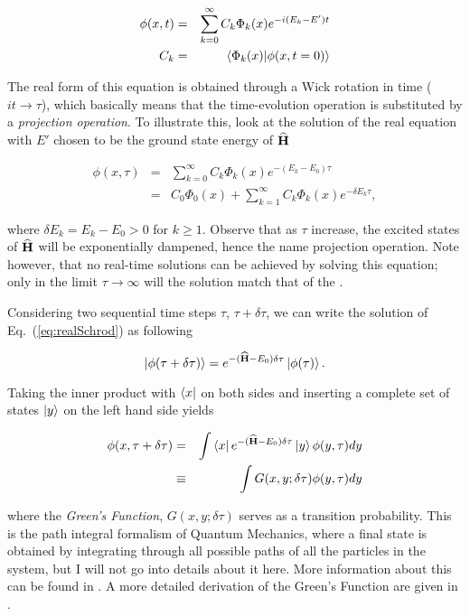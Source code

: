 \begin{eqnarray}
 \phi(x, t) &=& \sum_{k=0}^{\infty} C_k\Phi_k(x)e^{-i(E_k - E')t} \\
 C_k &=& \left\langle \Phi_k(x) | \phi(x, t=0)\right\rangle
\label{eq:realSchrod}
 \end{eqnarray}


The real form of this equation is obtained through a Wick rotation in time ($it \rightarrow \tau$), which basically means that the time-evolution operation is substituted by a \textit{projection operation}. To illustrate this, look at the solution of the real equation with $E'$ chosen to be the ground state energy of ${\bf\widehat{H}}$

\begin{eqnarray}
 \phi(x, \tau) &=& \sum_{k=0}^{\infty} C_k\Phi_k(x)e^{-(E_k - E_0)\tau} \\
                    &=& C_0\Phi_0(x) + \sum_{k=1}^{\infty} C_k\Phi_k(x)e^{-\delta E_k\tau},
\end{eqnarray}

where $\delta E_k = E_k - E_0 > 0$ for $k \ge 1$. Observe that as $\tau$ increase, the excited states of ${\bf\widehat{H}}$ will be exponentially dampened, hence the name projection operation. Note however, that no real-time solutions can be achieved by solving this equation; only in the limit $\tau\rightarrow\infty$ will the solution match that of the \schrodinger.


Considering two sequential time steps $\tau$, $\tau + \delta\tau$, we can write the solution of Eq.~(\ref{eq:realSchrod}) as following

\begin{equation*}
 \left| \phi(\tau + \delta\tau) \right> = e^{-({\bf\widehat{H}} - E_0)\delta\tau}\left| \phi(\tau) \right>.
\end{equation*}

Taking the inner product with $\left< x \right|$ on both sides and inserting a complete set of states $\left| y \right>$ on the left hand side yields

\begin{eqnarray*}
 \phi(x, \tau + \delta\tau) &=& \int \left< x \right|e^{-({\bf\widehat{H}} - E_0)\delta\tau}\left| y \right>\phi(y, \tau)dy \\
			     &\equiv& \int G(x, y; \delta\tau)\phi(y, \tau)dy
\end{eqnarray*}

where the \textit{Green's Function}, $G(x, y; \delta\tau)$ serves as a transition probability. This is the path integral formalism of Quantum Mechanics, where a final state is obtained by integrating through all possible paths of all the particles in the system, but I will not go into details about it here. More information about this can be found in \cite{leinaas}. A more detailed derivation of the Green's Function are given in \cite{abInitioMC}.

